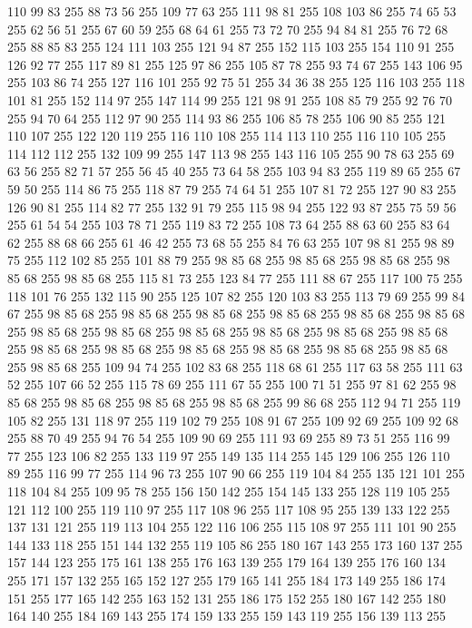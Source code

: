 110 99 83 255 88 73 56 255 109 77 63 255 111 98 81 255 108 103 86 255 74 65 53 255 62 56 51 255 67 60 59 255 68 64 61 255 73 72 70 255 94 84 81 255 76 72 68 255 88 85 83 255 124 111 103 255 121 94 87 255 152 115 103 255 154 110 91 255 126 92 77 255 117 89 81 255 125 97 86 255 105 87 78 255 93 74 67 255 143 106 95 255 103 86 74 255 127 116 101 255 92 75 51 255 34 36 38 255 125 116 103 255 118 101 81 255 152 114 97 255 147 114 99 255 121 98 91 255 108 85 79 255 92 76 70 255 94 70 64 255 112 97 90 255 114 93 86 255 106 85 78 255 106 90 85 255 121 110 107 255 122 120 119 255 116 110 108 255 114 113 110 255 116 110 105 255 114 112 112 255 132 109 99 255 147 113 98 255 143 116 105 255 90 78 63 255 69 63 56 255 82 71 57 255 56 45 40 255 73 64 58 255 103 94 83 255 119 89 65 255 67 59 50 255 114 86 75 255 118 87 79 255 74 64 51 255 107 81 72 255 127 90 83 255 126 90 81 255 114 82 77 255 132 91 79 255
115 98 94 255 122 93 87 255 75 59 56 255 61 54 54 255 103 78 71 255 119 83 72 255 108 73 64 255 88 63 60 255 83 64 62 255 88 68 66 255 61 46 42 255 73 68 55 255 84 76 63 255 107 98 81 255 98 89 75 255 112 102 85 255 101 88 79 255 98 85 68 255 98 85 68 255 98 85 68 255 98 85 68 255 98 85 68 255 115 81 73 255 123 84 77 255 111 88 67 255 117 100 75 255 118 101 76 255 132 115 90 255 125 107 82 255 120 103 83 255 113 79 69 255 99 84 67 255 98 85 68 255 98 85 68 255 98 85 68 255 98 85 68 255 98 85 68 255 98 85 68 255 98 85 68 255 98 85 68 255 98 85 68 255 98 85 68 255 98 85 68 255 98 85 68 255 98 85 68 255 98 85 68 255 98 85 68 255 98 85 68 255 98 85 68 255 98 85 68 255 98 85 68 255 109 94 74 255 102 83 68 255 118 68 61 255 117 63 58 255 111 63 52 255 107 66 52 255 115 78 69 255 111 67 55 255 100 71 51 255 97 81 62 255 98 85 68 255 98 85 68 255 98 85 68 255
98 85 68 255 99 86 68 255 112 94 71 255 119 105 82 255 131 118 97 255 119 102 79 255 108 91 67 255 109 92 69 255 109 92 68 255 88 70 49 255 94 76 54 255 109 90 69 255 111 93 69 255 89 73 51 255 116 99 77 255 123 106 82 255 133 119 97 255 149 135 114 255 145 129 106 255 126 110 89 255 116 99 77 255 114 96 73 255 107 90 66 255 119 104 84 255 135 121 101 255 118 104 84 255 109 95 78 255 156 150 142 255 154 145 133 255 128 119 105 255 121 112 100 255 119 110 97 255 117 108 96 255 117 108 95 255 139 133 122 255 137 131 121 255 119 113 104 255 122 116 106 255 115 108 97 255 111 101 90 255 144 133 118 255 151 144 132 255 119 105 86 255 180 167 143 255 173 160 137 255 157 144 123 255 175 161 138 255 176 163 139 255 179 164 139 255 176 160 134 255 171 157 132 255 165 152 127 255 179 165 141 255 184 173 149 255 186 174 151 255 177 165 142 255 163 152 131 255 186 175 152 255 180 167 142 255 180 164 140 255 184 169 143 255 174 159 133 255 159 143 119 255 156 139 113 255
